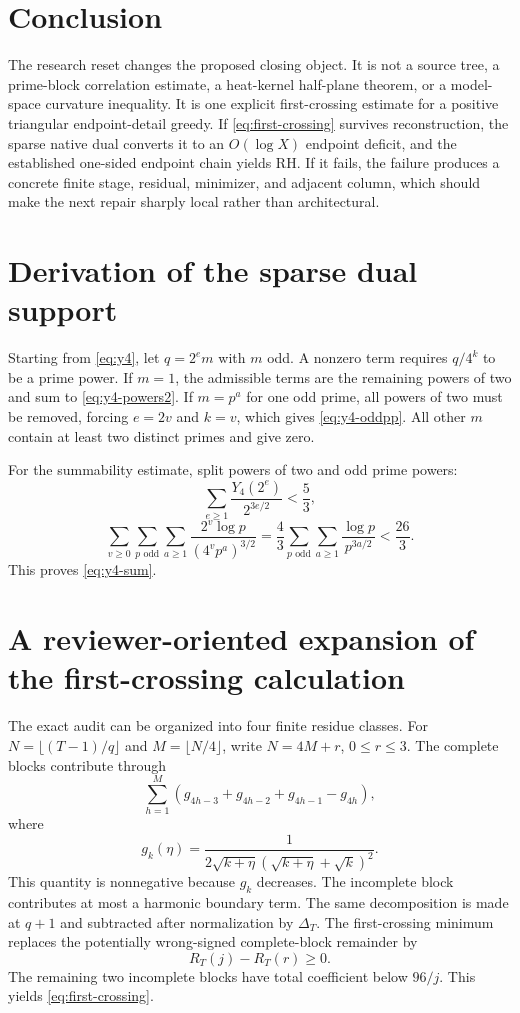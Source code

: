 \documentclass[11pt]{article}
\newcommand{\Yfour}{Y_4}
\begin{document}
\section{Conclusion}

The research reset changes the proposed closing object. It is not a source tree, a prime-block correlation estimate, a heat-kernel half-plane theorem, or a model-space curvature inequality. It is one explicit first-crossing estimate for a positive triangular endpoint-detail greedy. If \eqref{eq:first-crossing} survives reconstruction, the sparse native dual converts it to an $O(\log X)$ endpoint deficit, and the established one-sided endpoint chain yields RH. If it fails, the failure produces a concrete finite stage, residual, minimizer, and adjacent column, which should make the next repair sharply local rather than architectural.

\appendix

\section{Derivation of the sparse dual support}

Starting from \eqref{eq:y4}, let $q=2^em$ with $m$ odd. A nonzero term requires $q/4^k$ to be a prime power. If $m=1$, the admissible terms are the remaining powers of two and sum to \eqref{eq:y4-powers2}. If $m=p^a$ for one odd prime, all powers of two must be removed, forcing $e=2v$ and $k=v$, which gives \eqref{eq:y4-oddpp}. All other $m$ contain at least two distinct primes and give zero.

For the summability estimate, split powers of two and odd prime powers:
\[
 \sum_{e\ge1}\frac{\Yfour(2^e)}{2^{3e/2}}<\frac53,
\]
\[
 \sum_{v\ge0}\sum_{p\text{ odd}}\sum_{a\ge1}
 \frac{2^v\log p}{(4^vp^a)^{3/2}}
 =\frac43\sum_{p\text{ odd}}\sum_{a\ge1}\frac{\log p}{p^{3a/2}}
 <\frac{26}{3}.
\]
This proves \eqref{eq:y4-sum}.

\section{A reviewer-oriented expansion of the first-crossing calculation}

The exact audit can be organized into four finite residue classes. For $N=\lfloor(T-1)/q\rfloor$ and $M=\lfloor N/4\rfloor$, write $N=4M+r$, $0\le r\le3$. The complete blocks contribute through
\[
 \sum_{h=1}^{M}\left(g_{4h-3}+g_{4h-2}+g_{4h-1}-g_{4h}\right),
\]
where
\[
 g_k(\eta)=\frac1{2\sqrt{k+\eta}(\sqrt{k+\eta}+\sqrt k)^2}.
\]
This quantity is nonnegative because $g_k$ decreases. The incomplete block contributes at most a harmonic boundary term. The same decomposition is made at $q+1$ and subtracted after normalization by $\Delta_T$. The first-crossing minimum replaces the potentially wrong-signed complete-block remainder by
\[
 R_T(j)-R_T(r)\ge0.
\]
The remaining two incomplete blocks have total coefficient below $96/j$. This yields \eqref{eq:first-crossing}.
\end{document}

